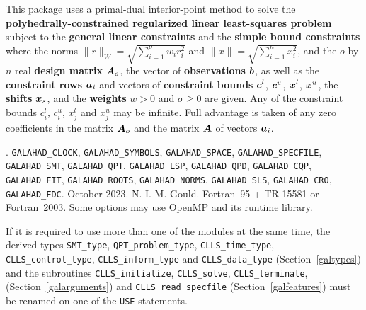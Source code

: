 \documentclass{galahad}
\newcommand{\packagename}{CLLS}
\newcommand{\fullpackagename}{\libraryname\_\packagename}
\begin{document}
\galheader


\galsummary
This package uses a primal-dual interior-point method to solve the
{\bf polyhedrally-constrained regularized linear least-squares problem}
subject to the {\bf general linear constraints}
and the {\bf simple bound constraints}
where the norms $\|r\|_W = \sqrt{\sum_{i=1}^o w_i r_i^2}$
and $\|x\| = \sqrt{\sum_{i=1}^n x_i^2}$,
and the $o$ by $n$ real {\bf design matrix} ${\bm{A}}_o$, the
vector of {\bf observations} ${\bm{b}}$, as well as 
the {\bf constraint rows} ${\bm{a}}_{i}$ and vectors of {\bf constraint bounds}
${\bm{c}}^{l}$, ${\bm{c}}^{u}$, ${\bm{x}}^{l}$, ${\bm{x}}^{u}$, the {\bf shifts} ${\bm{x}}_s$, 
and the {\bf weights} $w > 0$ and $\sigma \geq 0$ 
are given. Any of the constraint bounds $c_{i}^{l}$, $c_{i}^{u}$,
$x_{j}^{l}$ and $x_{j}^{u}$ may be infinite.
Full advantage is taken of any zero coefficients in the matrix ${\bm{A}}_o$
and the matrix ${\bm{A}}$ of vectors ${\bm{a}}_{i}$.


\galattributes
\galversions{\tt  \fullpackagename\_single, \fullpackagename\_double}.
\galuses
{\tt GALAHAD\_CLOCK},
{\tt GALAHAD\_SY\-M\-BOLS},
{\tt GALAHAD\-\_SPACE},
{\tt GALAHAD\_SPECFILE},
{\tt GALAHAD\_SMT},
{\tt GALAHAD\_QPT},
{\tt GALAHAD\_LSP},
{\tt GALAHAD\_\-QPD},
{\tt GALAHAD\_\-CQP},
{\tt GALAHAD\_\-FIT},
{\tt GALAHAD\_\-ROOTS},
{\tt GALAHAD\_\-NORMS},
{\tt GALAHAD\_\-SLS},
{\tt GALAHAD\_\-CRO},
{\tt GALAHAD\_FDC}.
\galdate October 2023.
\galorigin N. I. M. Gould.
\gallanguage Fortran~95 + TR 15581 or Fortran~2003.
\galparallelism Some options may use OpenMP and its runtime library.


\galhowto




\noindent
If it is required to use more than one of the modules at the same time, 
the derived types
{\tt SMT\_type},
{\tt QPT\_problem\_type},
{\tt \packagename\_time\_type},
{\tt \packagename\_control\_type},
{\tt \packagename\_inform\_type}
and
{\tt \packagename\_data\_type}
(Section~\ref{galtypes})
and the subroutines
{\tt \packagename\_initialize},
{\tt \packagename\_\-solve},
{\tt \packagename\_terminate},
(Section~\ref{galarguments})
and
{\tt \packagename\_read\_specfile}
(Section~\ref{galfeatures})
must be renamed on one of the {\tt USE} statements.
\end{document}
